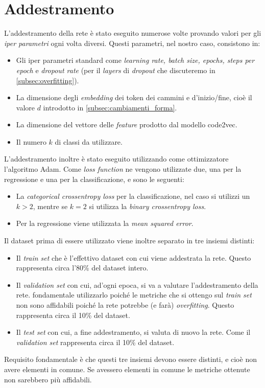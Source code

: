 \section{Addestramento}
L'addestramento della rete è stato eseguito numerose volte provando valori per gli \textit{iper parametri} ogni volta diversi. 
Questi parametri, nel nostro caso, consistono in:
    \begin{itemize}
        \item Gli iper parametri standard come \textit{learning rate, batch size, epochs, steps per epoch} e \textit{dropout rate} (per il \textit{layers} di \textit{dropout} che discuteremo in \autoref{subsec:overfitting}).
        \item La dimensione degli \textit{embedding} dei token dei cammini e d'inizio/fine, cioè il valore $d$ introdotto in \autoref{subsec:cambiamenti_forma}.
        \item La dimensione del vettore delle \textit{feature} prodotto dal modello code2vec.
        \item Il numero $k$ di classi da utilizzare. 
    \end{itemize}
L'addestramento inoltre è stato eseguito utilizzando come ottimizzatore l'algoritmo Adam. 
Come \textit{loss function} ne vengono utilizzate due, una per la regressione e una per la classificazione, e sono le seguenti:
    \begin{itemize}
        \item La \textit{categorical crossentropy loss} per la classificazione, nel caso si utilizzi un $k>2$, mentre se $k=2$ si utilizza la \textit{binary crossentropy loss}.
        \item Per la regressione viene utilizzata la \textit{mean squared error}.
    \end{itemize}
Il dataset prima di essere utilizzato viene inoltre separato in tre insiemi distinti:
    \begin{itemize}
        \item Il \textit{train set} che è l'effettivo dataset con cui viene addestrata la rete. Questo rappresenta circa l'80\% del dataset intero.
        \item Il \textit{validation set} con cui, ad'ogni epoca, si va a valutare l'addestramento della rete. \Eaccentata{} fondamentale utilizzarlo poiché le metriche che si ottengo sul \textit{train set} non sono affidabili
                poiché la rete potrebbe (e farà) \textit{overfitting}. Questo rappresenta circa il 10\% del dataset.
        \item Il \textit{test set} con cui, a fine addestramento, si valuta di nuovo la rete. Come il \textit{validation set} rappresenta circa il 10\% del dataset.
    \end{itemize}
Requisito fondamentale è che questi tre insiemi devono essere distinti, e cioè non avere elementi in comune. 
Se avessero elementi in comune le metriche ottenute non sarebbero più affidabili. 

